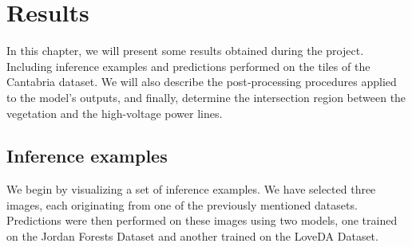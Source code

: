 \chapter{Results}
In this chapter, we will present some results obtained during the project. Including inference examples and predictions performed on the tiles of the Cantabria dataset. We will also describe the post‑processing procedures applied to the model’s outputs, and finally, determine the intersection region between the vegetation and the high-voltage power lines.\\

\section{Inference examples} 
We begin by visualizing a set of inference examples. We have selected three images, each originating from one of the previously mentioned datasets. Predictions were then performed on these images using two models, one trained on the Jordan Forests Dataset and another trained on the LoveDA Dataset. 
